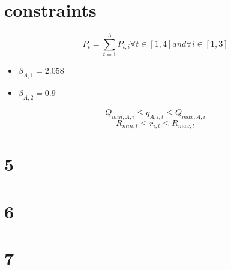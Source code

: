 \documentclass{article}
\begin{document}
\section{constraints}
\begin{equation}
P_t=\sum_{t=1}^{3}P_{t,i} \forall t\in [1,4] and \forall i\in [1,3]
\end{equation}
\begin{itemize}
\item $\beta_{A,1}=2.058$
\item $\beta_{A,2}=0.9$
\end{itemize}
\begin{equation}
Q_{min,A,i}\leq q_{A,i,t}\leq Q_{max,A,i}
\end{equation}
\begin{equation}
R_{min,t}\leq r_{i,t}\leq R_{max,t}
\end{equation}
\section{5}

\section{6}

\section{7}
\end{document}
